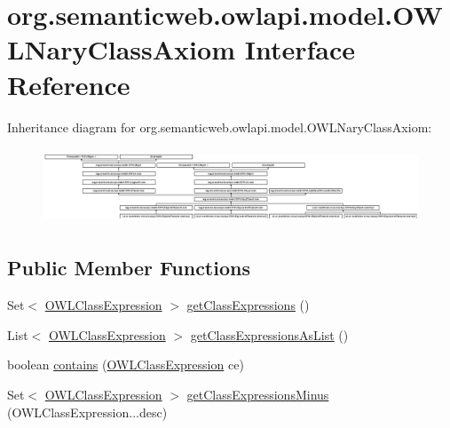 \hypertarget{interfaceorg_1_1semanticweb_1_1owlapi_1_1model_1_1_o_w_l_nary_class_axiom}{\section{org.\-semanticweb.\-owlapi.\-model.\-O\-W\-L\-Nary\-Class\-Axiom Interface Reference}
\label{interfaceorg_1_1semanticweb_1_1owlapi_1_1model_1_1_o_w_l_nary_class_axiom}
}
Inheritance diagram for org.\-semanticweb.\-owlapi.\-model.\-O\-W\-L\-Nary\-Class\-Axiom\-:\begin{figure}[H]
\begin{center}
\leavevmode
\includegraphics[height=2.285714cm]{interfaceorg_1_1semanticweb_1_1owlapi_1_1model_1_1_o_w_l_nary_class_axiom}
\end{center}
\end{figure}
\subsection*{Public Member Functions}
\begin{DoxyCompactItemize}
\item 
Set$<$ \hyperlink{interfaceorg_1_1semanticweb_1_1owlapi_1_1model_1_1_o_w_l_class_expression}{O\-W\-L\-Class\-Expression} $>$ \hyperlink{interfaceorg_1_1semanticweb_1_1owlapi_1_1model_1_1_o_w_l_nary_class_axiom_a0c6cd723ef6ae38bfcca901c99e3f030}{get\-Class\-Expressions} ()
\item 
List$<$ \hyperlink{interfaceorg_1_1semanticweb_1_1owlapi_1_1model_1_1_o_w_l_class_expression}{O\-W\-L\-Class\-Expression} $>$ \hyperlink{interfaceorg_1_1semanticweb_1_1owlapi_1_1model_1_1_o_w_l_nary_class_axiom_a995bac9910bc680decd8b8fc2b539d3e}{get\-Class\-Expressions\-As\-List} ()
\item 
boolean \hyperlink{interfaceorg_1_1semanticweb_1_1owlapi_1_1model_1_1_o_w_l_nary_class_axiom_a1a9332c153b6deccdcda3924adacdc97}{contains} (\hyperlink{interfaceorg_1_1semanticweb_1_1owlapi_1_1model_1_1_o_w_l_class_expression}{O\-W\-L\-Class\-Expression} ce)
\item 
Set$<$ \hyperlink{interfaceorg_1_1semanticweb_1_1owlapi_1_1model_1_1_o_w_l_class_expression}{O\-W\-L\-Class\-Expression} $>$ \hyperlink{interfaceorg_1_1semanticweb_1_1owlapi_1_1model_1_1_o_w_l_nary_class_axiom_a5cba5f66ceb954e4cb8ec633ca0271e4}{get\-Class\-Expressions\-Minus} (O\-W\-L\-Class\-Expression...\-desc)
\end{DoxyCompactItemize}



